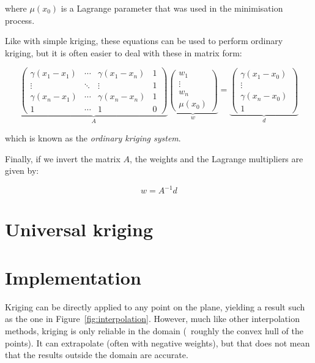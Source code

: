 where \(\mu(x_0)\) is a Lagrange parameter that was used in the minimisation process.

Like with simple kriging, these equations can be used to perform ordinary kriging, but it is often easier to deal with these in matrix form:

\begin{equation}
%
\underbrace{\left( \begin{array}{cccc}
\gamma(x_1-x_1) & \cdots & \gamma(x_1-x_n) & 1 \\
\vdots & \ddots & \vdots & 1 \\
\gamma(x_n-x_1) & \cdots & \gamma(x_n-x_n) & 1 \\
1 & \cdots & 1 & 0 \end{array} \right)}_{A}
%
\underbrace{\left(\begin{array}{c}
w_1 \\
\vdots \\
w_n \\
\mu(x_0) \end{array} \right)}_{w} = 
%
\underbrace{\left(\begin{array}{c}
\gamma(x_1-x_0) \\
\vdots \\
\gamma(x_n-x_0) \\
1 \end{array} \right)}_{d}
\end{equation}

which is known as the \emph{ordinary kriging system}.

Finally, if we invert the matrix \(A\), the weights and the Lagrange multipliers are given by:

\begin{equation}
w = A^{-1}d
\end{equation}

\section{Universal kriging}%

%
\section{Implementation}

Kriging can be directly applied to any point on the plane, yielding a result such as the one in Figure~\ref{fig:interpolation}.
However, much like other interpolation methods, kriging is only reliable in the domain (\ie\ roughly the convex hull of the points).
It can extrapolate (often with negative weights), but that does not mean that the results outside the domain are accurate.

